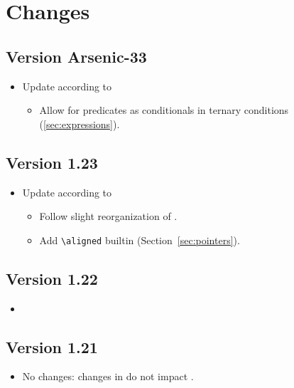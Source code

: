 \section{Changes}

\subsection*{Version Arsenic-33}
\begin{itemize}
  \item Update according to 
    \begin{itemize}
      \item Allow for predicates as conditionals in ternary conditions (\ref{sec:expressions}).
    \end{itemize}
\end{itemize}

\subsection*{Version 1.23}
\begin{itemize}
  \item Update according to 
    \begin{itemize}
    \item Follow slight reorganization of \acsl.
    \item Add \lstinline|\aligned| builtin (Section~\ref{sec:pointers}).
    \end{itemize}
\end{itemize}

\subsection*{Version 1.22}
\begin{itemize}
  \item {}
\end{itemize}

\subsection*{Version 1.21}
\begin{itemize}
  \item No changes: changes in  do not impact \eacsl.
\end{itemize}

